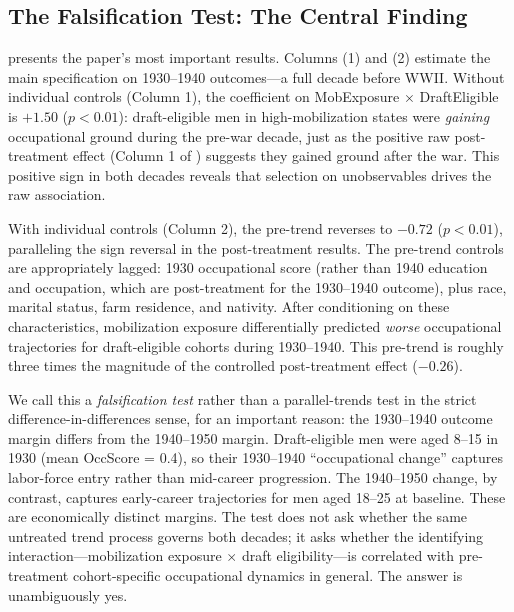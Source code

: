\documentclass[12pt]{article}
\begin{document}
\subsection{The Falsification Test: The Central Finding}
\label{sec:pretrend}

 presents the paper's most important results. Columns (1) and (2) estimate the main specification on 1930--1940 outcomes---a full decade before WWII. Without individual controls (Column 1), the coefficient on MobExposure $\times$ DraftEligible is $+1.50$ ($p < 0.01$): draft-eligible men in high-mobilization states were \textit{gaining} occupational ground during the pre-war decade, just as the positive raw post-treatment effect (Column 1 of ) suggests they gained ground after the war. This positive sign in both decades reveals that selection on unobservables drives the raw association.

With individual controls (Column 2), the pre-trend reverses to $-0.72$ ($p < 0.01$), paralleling the sign reversal in the post-treatment results. The pre-trend controls are appropriately lagged: 1930 occupational score (rather than 1940 education and occupation, which are post-treatment for the 1930--1940 outcome), plus race, marital status, farm residence, and nativity. After conditioning on these characteristics, mobilization exposure differentially predicted \textit{worse} occupational trajectories for draft-eligible cohorts during 1930--1940. This pre-trend is roughly three times the magnitude of the controlled post-treatment effect ($-0.26$).



We call this a \textit{falsification test} rather than a parallel-trends test in the strict difference-in-differences sense, for an important reason: the 1930--1940 outcome margin differs from the 1940--1950 margin. Draft-eligible men were aged 8--15 in 1930 (mean OccScore = 0.4), so their 1930--1940 ``occupational change'' captures labor-force entry rather than mid-career progression. The 1940--1950 change, by contrast, captures early-career trajectories for men aged 18--25 at baseline. These are economically distinct margins. The test does not ask whether the same untreated trend process governs both decades; it asks whether the identifying interaction---mobilization exposure $\times$ draft eligibility---is correlated with pre-treatment cohort-specific occupational dynamics in general. The answer is unambiguously yes.
\end{document}
